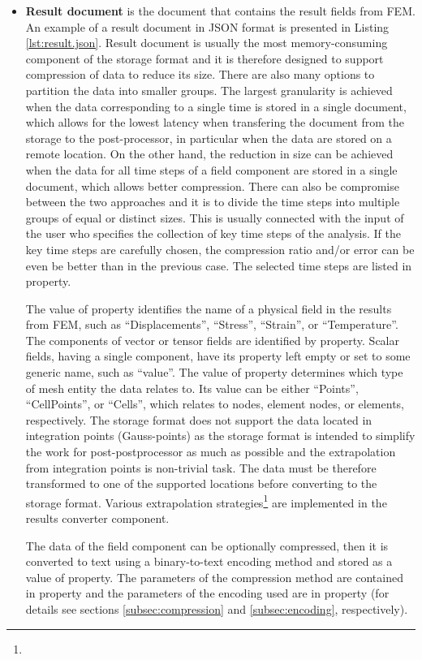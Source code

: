 \begin{itemize}
    \item \textbf{Result document} is the document that contains the result fields from FEM. An example of a result document in JSON format is presented in Listing \ref{lst:result.json}. Result document is usually the most memory-consuming component of the storage format and it is therefore designed to support compression of data to reduce its size. There are also many options to partition the data into smaller groups. The largest granularity is achieved when the data corresponding to a single time is stored in a single document, which allows for the lowest latency when transfering the document from the storage to the post-processor, in particular when the data are stored on a remote location. On the other hand, the reduction in size can be achieved when the data for all time steps of a field component are stored in a single document, which allows better compression. There can also be compromise between the two approaches and it is to divide the time steps into multiple groups of equal or distinct sizes. This is usually connected with the input of the user who specifies the collection of key time steps of the analysis. If the key time steps are carefully chosen, the compression ratio and/or error can be even be better than in the previous case. The selected time steps are listed in  property.

    The value of  property identifies the name of a physical field in the results from FEM, such as ``Displacements'', ``Stress'', ``Strain'', or ``Temperature''. The components of vector or tensor fields are identified by  property. Scalar fields, having a single component, have its  property left empty or set to some generic name, such as ``value''. The value of  property determines which type of mesh entity the data relates to. Its value can be either ``Points'', ``CellPoints'', or ``Cells'', which relates to nodes, element nodes, or elements, respectively. The storage format does not support the data located in integration points (Gauss-points) as the storage format is intended to simplify the work for post-postprocessor as much as possible and the extrapolation from integration points is non-trivial task. The data must be therefore transformed to one of the supported locations before converting to the storage format. Various extrapolation strategies\footnote{} are implemented in the results converter component.

    The data of the field component can be optionally compressed, then it is converted to text using a binary-to-text encoding method and stored as a value of  property. The parameters of the compression method are contained in  property and the parameters of the encoding used are in  property (for details see sections \ref{subsec:compression} and \ref{subsec:encoding}, respectively).

\end{itemize}


